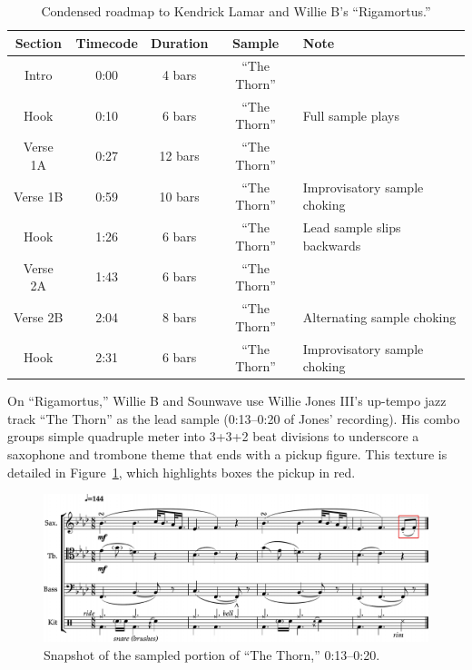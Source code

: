    \begin{table}[ht]
        \centering
            \begin{tabular}{|c|c|c|c|l|}
                \hline
                Section  & Timecode & Duration & Sample        & Note \\ \hline
                Intro    & 0:00     & 4 bars   & ``The Thorn'' & \\ \hline
                Hook     & 0:10     & 6 bars   & ``The Thorn'' & Full sample plays \\ \hline
                Verse 1A & 0:27     & 12 bars  & ``The Thorn'' & \\ \hline
                Verse 1B & 0:59     & 10 bars  & ``The Thorn'' & Improvisatory sample choking \\ \hline
                Hook     & 1:26     & 6 bars   & ``The Thorn'' & Lead sample slips backwards \\ \hline
                Verse 2A & 1:43     & 6 bars   & ``The Thorn'' & \\ \hline
                Verse 2B & 2:04     & 8 bars   & ``The Thorn'' & Alternating sample choking \\ \hline
                Hook     & 2:31     & 6 bars   & ``The Thorn'' & Improvisatory sample choking\\ \hline
            \end{tabular}
        \caption{Condensed roadmap to Kendrick Lamar and Willie B's ``Rigamortus.''}
        \label{tab:rigamortus}
    \end{table}

On ``Rigamortus,'' Willie B and Sounwave use Willie Jones  III's up-tempo jazz track ``The Thorn''
as the lead sample (0:13--0:20 of Jones' recording). His combo groups simple quadruple meter 
into 3+3+2 beat divisions to underscore a saxophone and trombone theme that ends with a pickup
figure. This texture is detailed in Figure~\ref{fig:thethornfull}, which highlights boxes the
pickup in red.

    \begin{figure}[ht]
        \centering
        \includegraphics[width=\textwidth]{images/figures/chp 02/013020thethornfull.pdf}
        \caption{Snapshot of the sampled portion of ``The Thorn,'' 0:13--0:20.}
        \label{fig:thethornfull}
    \end{figure}


